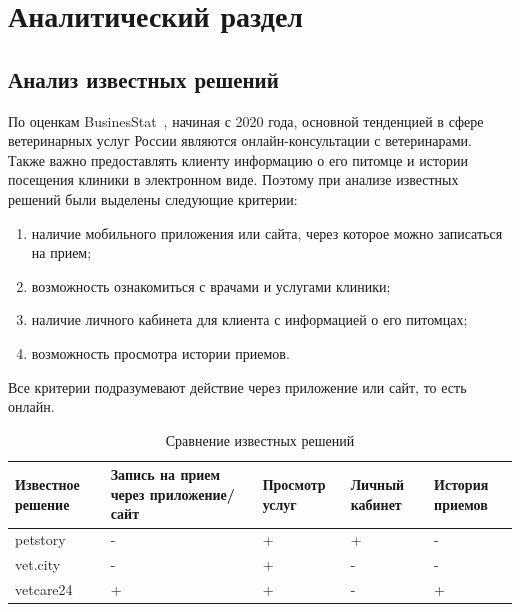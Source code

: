 \section{Аналитический раздел}

\subsection{Анализ известных решений}

По оценкам BusinesStat~\cite{businesstat}, начиная с 2020 года, основной тенденцией в сфере ветеринарных услуг России являются онлайн-консультации с ветеринарами. Также важно предоставлять клиенту информацию о его питомце и истории посещения клиники в электронном виде. Поэтому при анализе известных решений были выделены следующие критерии:
\begin{enumerate}[label*=---]
	\item наличие мобильного приложения или сайта, через которое можно записаться на прием;
	\item возможность ознакомиться с врачами и услугами клиники;
 	\item наличие личного кабинета для клиента с информацией о его питомцах;
 	\item возможность просмотра истории приемов.
 \end{enumerate}

Все критерии подразумевают действие через приложение или сайт, то есть онлайн.

\begin{table}[hbtp]
	\begin{center}
		\begin{flushleft}
			\captionsetup{justification=raggedright, singlelinecheck=false}
			\caption{\label{tab:solve}Сравнение известных решений}
		\end{flushleft}
		\begin{tabular}{|  p{} | p{} | p{}  |  p{} | p{}|} 
			\hline  Известное решение & Запись на прием через приложение/ сайт & Просмотр услуг  & Личный кабинет & История приемов \\ \hline
			petstory~\cite{petstory} &   - &   + & + & - \\ \hline
			vet.city~\cite{vetcity} &   -  &   + & - & -  \\ \hline
			vetcare24~\cite{vetcare24} &  + &  + & - & + \\ \hline
		\end{tabular}
	\end{center}
\end{table}

